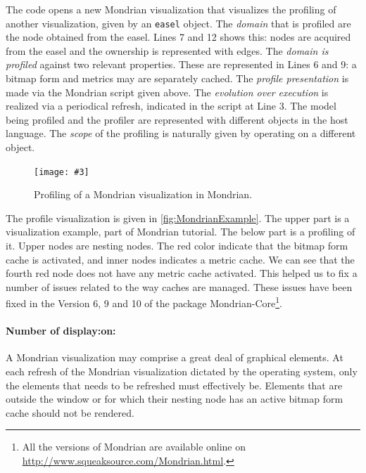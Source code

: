 \documentclass[runningheads]{llncs}
\newcommand{\ct}{\lstinline[backgroundcolor=\color{white},basicstyle=\footnotesize\ttfamily]}
\newcommand{\ab}[1]{\nb{Alexandre}{blue}{#1}}
\newcommand{\jr}[1]{\nb{Jorge}{cyan}{#1}}
\newcommand{\fig}[4]{
	\begin{figure}[#1]
		\centering
		\texttt{[image: \#3]}
		\caption{\label{fig:#3}#4}
	\end{figure}}
\begin{document}
The code opens a new Mondrian visualization that visualizes the profiling of another visualization, given by an \ct{easel} object. The \emph{domain} that is profiled are the node obtained from the easel. Lines 7 and 12 shows this: nodes are acquired from the easel and the ownership is represented with edges. The \emph{domain is profiled} against two relevant properties. These are represented in Lines 6 and 9: a bitmap form and metrics may are separately cached. The \emph{profile presentation} is made via the Mondrian script given above. The \emph{evolution over execution} is realized via a periodical refresh, indicated in the script at Line 3. The model being profiled and the profiler are represented with different objects in the host language. The \emph{scope} of the profiling is naturally given by operating on a different object.

\fig{}{.8}{MondrianExample}{Profiling of a Mondrian visualization in Mondrian.}

The profile visualization is given in \autoref{fig:MondrianExample}. The upper part is a visualization example, part of Mondrian tutorial. The below part is a profiling of it. Upper nodes are nesting nodes. The red color indicate that the bitmap form cache is activated, and inner nodes indicates a metric cache. We can see that the fourth red node does not have any metric cache activated. This helped us to fix a number of issues related to the way caches are managed. These issues have been fixed in the Version 6, 9 and 10 of the package Mondrian-Core\footnote{All the versions of Mondrian are available online on \url{http://www.squeaksource.com/Mondrian.html}.}.


\paragraph{Number of display:on:}
A Mondrian visualization may comprise a great deal of graphical elements. At each refresh of the Mondrian visualization dictated by the operating system, only the elements that needs to be refreshed must effectively be. Elements that are outside the window or for which their nesting node has an active bitmap form cache should not be rendered. 
\end{document}
